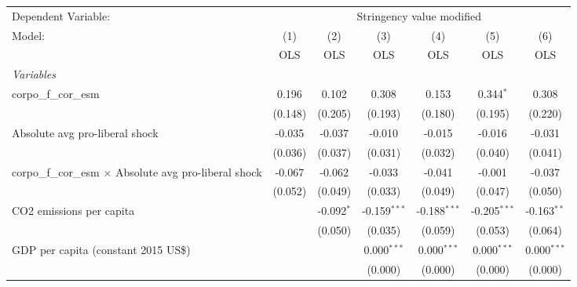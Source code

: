 
\begingroup
\centering
\begin{tabular}{lcccccc}
   \toprule
   Dependent Variable: & \multicolumn{6}{c}{Stringency value modified}\\
   Model:                                                         & (1)     & (2)          & (3)            & (4)            & (5)            & (6)\\  
                                                                  &  OLS    & OLS          & OLS            & OLS            & OLS            & OLS\\  
   \midrule
   \emph{Variables}\\
   corpo\_f\_cor\_esm                                             & 0.196   & 0.102        & 0.308          & 0.153          & 0.344$^{*}$    & 0.308\\   
                                                                  & (0.148) & (0.205)      & (0.193)        & (0.180)        & (0.195)        & (0.220)\\   
   Absolute avg pro-liberal shock                                 & -0.035  & -0.037       & -0.010         & -0.015         & -0.016         & -0.031\\   
                                                                  & (0.036) & (0.037)      & (0.031)        & (0.032)        & (0.040)        & (0.041)\\   
   corpo\_f\_cor\_esm $\times$ Absolute avg pro-liberal shock     & -0.067  & -0.062       & -0.033         & -0.041         & -0.001         & -0.037\\   
                                                                  & (0.052) & (0.049)      & (0.033)        & (0.049)        & (0.047)        & (0.050)\\   
   CO2 emissions per capita                                       &         & -0.092$^{*}$ & -0.159$^{***}$ & -0.188$^{***}$ & -0.205$^{***}$ & -0.163$^{**}$\\   
                                                                  &         & (0.050)      & (0.035)        & (0.059)        & (0.053)        & (0.064)\\   
   GDP per capita (constant 2015 US\$)                            &         &              & 0.000$^{***}$  & 0.000$^{***}$  & 0.000$^{***}$  & 0.000$^{***}$\\   
                                                                  &         &              & (0.000)        & (0.000)        & (0.000)        & (0.000)\\   

\end{tabular}
